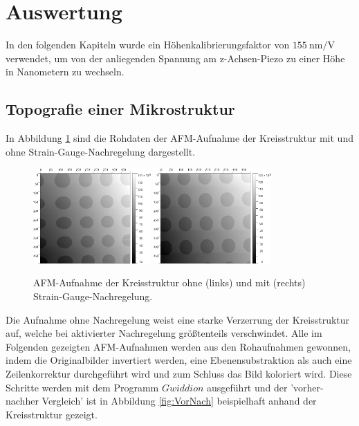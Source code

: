 \newpage
\section{Auswertung}
    In den folgenden Kapiteln wurde ein Höhenkalibrierungsfaktor von $\SI{155}{\nano\metre\per\volt}$ verwendet, um von der anliegenden Spannung am z-Achsen-Piezo zu einer Höhe in Nanometern zu wechseln.
    \subsection{Topografie einer Mikrostruktur}
    \label{sec:Mikro}
        In Abbildung \ref{fig:Strain} sind die Rohdaten der AFM-Aufnahme der Kreisstruktur mit und ohne Strain-Gauge-Nachregelung dargestellt.
        \begin{figure}
            \centering
            \includegraphics[width = 0.40\textwidth]{pictures/OhneStrain.png}
            \includegraphics[width = 0.40\textwidth]{pictures/Raw.png}
            \caption{AFM-Aufnahme der Kreisstruktur ohne (links) und mit (rechts) Strain-Gauge-Nachregelung.}
            \label{fig:Strain}    
        \end{figure}
        Die Aufnahme ohne Nachregelung weist eine starke Verzerrung der Kreisstruktur auf, welche bei aktivierter Nachregelung größtenteils verschwindet.
        Alle im Folgenden gezeigten AFM-Aufnahmen werden aus den Rohaufnahmen gewonnen, indem die Originalbilder invertiert werden, eine Ebenensubstraktion als auch eine Zeilenkorrektur durchgeführt wird und zum Schluss das Bild koloriert wird. Diese Schritte werden mit dem Programm $\textit{Gwiddion}$ \cite{Gwyddion} ausgeführt und der 'vorher-nachher Vergleich' ist in Abbildung \ref{fig:VorNach} beispielhaft anhand der Kreisstruktur gezeigt.
